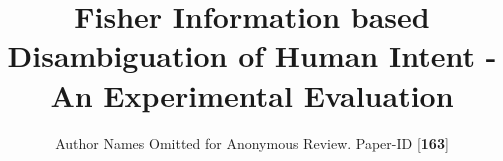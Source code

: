 \documentclass[conference]{IEEEtran}
\begin{document}
\title{Fisher Information based Disambiguation of Human Intent - An Experimental Evaluation}
\author{Author Names Omitted for Anonymous Review. Paper-ID [\textbf{163}]}




% 
%	
%	
%	
%	

\maketitle
\end{document}
